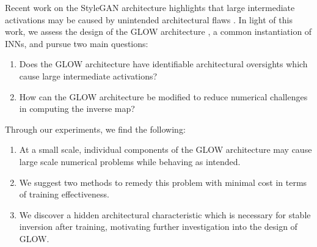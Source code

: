 Recent work on the StyleGAN architecture highlights that large intermediate activations may be caused by unintended architectural flaws \cite{karras2019analyzing}. In light of this work, we assess the design of the GLOW architecture \cite{kingma2018glow}, a common instantiation of INNs, and pursue two main questions:
\begin{enumerate}
    \item Does the GLOW architecture have identifiable architectural oversights which cause large intermediate activations?
    \item How can the GLOW architecture be modified to reduce numerical challenges in computing the inverse map? 
\end{enumerate}

Through our experiments, we find the following:
\begin{enumerate}
    \item At a small scale, individual components of the GLOW architecture may cause large scale numerical problems while behaving as intended.  
    \item We suggest two methods to remedy this problem with minimal cost in terms of training effectiveness.
    \item We discover a hidden architectural characteristic which is necessary for stable inversion after training, motivating further investigation into the design of GLOW.
\end{enumerate}